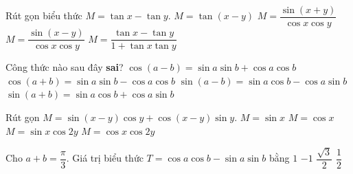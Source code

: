 

\begin{ex}%
	Rút gọn biểu thức $M = \tan x - \tan  y$.
	 \choice
		{$M =  \tan(x-y)$}
		{$M =  \dfrac{\sin(x+y)}{\cos x \cos y}$}
		{\True $M = \dfrac{\sin(x-y)}{\cos x  \cos y}$}
		{$M = \dfrac{\tan x -  \tan y}{1+\tan x \tan y}$}
\end{ex}

\begin{ex}%
	Công thức nào sau đây \textbf{sai}? 
	 \choice
		{$\cos (a-b)  = \sin a \sin b + \cos a \cos b$}
		{\True $\cos (a+b) = \sin a  \sin b - \cos a \cos b$}
		{$\sin (a-b)  = \sin a \cos b - \cos a \sin b$}
		{$\sin (a+b) = \sin a \cos b + \cos a \sin b$} 
\end{ex}

\begin{ex}%
	Rút gọn $M = \sin(x-y)\cos y +  \cos(x-y)\sin y$.
	\choice 
		{\True $M = \sin  x$}
		{$M =  \cos x$}
		 {$M = \sin x \cos 2y$}
		{$M = \cos x \cos 2y$} 
\end{ex}

\begin{ex}%
	Cho $a+b=\dfrac{\pi}{3}$. Giá trị biểu thức $T=\cos  a\cos b-\sin a\sin b$ bằng
	 \choice
		 {$1$}
		 {$-1$}
		 {$\dfrac{\sqrt{3}}{2}$}
		{\True  $\dfrac{1}{2}$}
\end{ex}

